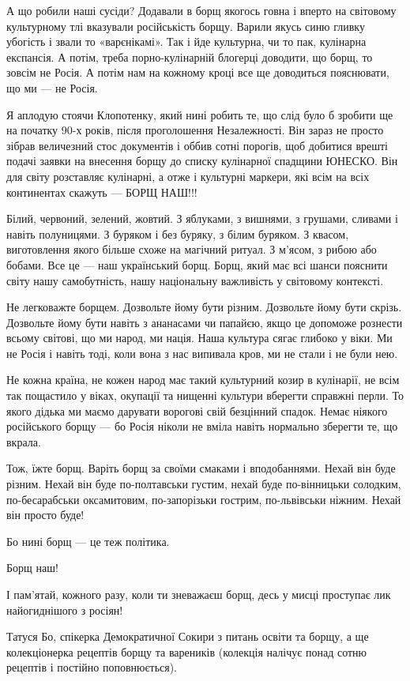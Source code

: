 А що робили наші сусіди? Додавали в борщ якогось говна і вперто на світовому
культурному тлі вказували російськість борщу. Варили якусь синю гливку убогість
і звали то «варєнікамі». Так і йде культурна, чи то пак, кулінарна експансія. А
потім, треба порно-кулінарній блогерці доводити, що борщ, то зовсім не Росія. А
потім нам на кожному кроці все ще доводиться пояснювати, що ми — не Росія.

Я аплодую стоячи Клопотенку, який нині робить те, що слід було б зробити ще на
початку 90-х років, після проголошення Незалежності. Він зараз не просто зібрав
величезний стос документів і оббив сотні порогів, щоб добитися врешті подачі
заявки на внесення борщу до списку кулінарної спадщини ЮНЕСКО. Він для світу
розставляє кулінарні, а отже і культурні маркери, які всім на всіх континентах
скажуть — БОРЩ НАШ!!!

Білий, червоний, зелений, жовтий. З яблуками, з вишнями, з грушами, сливами і
навіть полуницями. З буряком і без буряку, з білим буряком. З квасом,
виготовлення якого більше схоже на магічний ритуал. З м'ясом, з рибою або
бобами. Все це — наш український борщ. Борщ, який має всі шанси пояснити світу
нашу самобутність, нашу національну важливість у світовому контексті. 

Не легковажте борщем. Дозвольте йому бути різним. Дозвольте йому бути скрізь.
Дозвольте йому бути навіть з ананасами чи папайєю, якщо це допоможе рознести
всьому світові, що ми народ, ми нація.  Наша культура сягає глибоко у віки. Ми
не Росія і навіть тоді, коли вона з нас випивала кров, ми не стали і не були
нею.

Не кожна країна, не кожен народ має такий культурний козир в кулінарії, не всім
так пощастило у віках, окупації та нищенні культури вберегти справжні перли. То
якого дідька ми маємо дарувати ворогові свій безцінний спадок. Немає ніякого
російського борщу — бо Росія ніколи не вміла навіть нормально зберегти те, що
вкрала.

Тож, їжте борщ. Варіть борщ за своїми смаками і вподобаннями. Нехай він буде
різним. Нехай він буде по-полтавськи густим, нехай буде по-вінницьки солодким,
по-бесарабськи оксамитовим, по-запорізьки гострим, по-львівськи ніжним. Нехай
він просто буде! 

Бо нині борщ — це теж політика.

Борщ наш!

І пам’ятай, кожного разу, коли ти зневажаєш борщ, десь у мисці проступає лик найогиднішого з росіян!

Татуся Бо, спікерка Демократичної Сокири з питань освіти та борщу, а ще
колекціонерка рецептів борщу та вареників (колекція налічує понад сотню
рецептів і постійно поповнюється).

